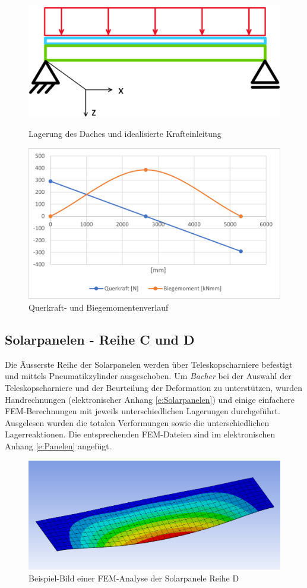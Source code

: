 \begin{figure}[h]
\centering
\begin{minipage}{.4\textwidth}
  \centering
  \includegraphics[width=.98\linewidth]{04_figures/Dach Idealisierung.png}
  \caption{Lagerung des Daches und idealisierte Krafteinleitung}
  \label{Dach Idealisierung}
\end{minipage}%
\begin{minipage}{.6\textwidth}
  \centering
  \includegraphics[width=.98\linewidth]{04_figures/Dach QM.png}
  \caption{Querkraft- und Biegemomentenverlauf}
  \label{Dach QM}
\end{minipage}
\end{figure}


\subsection{Solarpanelen - Reihe C und D}
Die Äusserste Reihe der Solarpanelen werden über Teleskopscharniere befestigt und mittels Pneumatikzylinder ausgeschoben. Um \emph{Bacher} bei der Auswahl der Teleskopscharniere und der Beurteilung der Deformation zu unterstützen, wurden Handrechnungen (elektronischer Anhang \ref{e:Solarpanelen}) und einige einfachere FEM-Berechnungen mit jeweils unterschiedlichen Lagerungen durchgeführt. Ausgelesen wurden die totalen Verformungen sowie die unterschiedlichen Lagerreaktionen. Die entsprechenden FEM-Dateien sind im elektronischen Anhang \ref{e:Panelen} angefügt.

\begin{figure}[h]
  \centering
  \includegraphics[width=.6\linewidth]{04_figures/Panelen Verformung.png}
  \caption{Beispiel-Bild einer FEM-Analyse der Solarpanele Reihe D}
  \label{Panelen Verformung}
\end{figure}
\newpage
